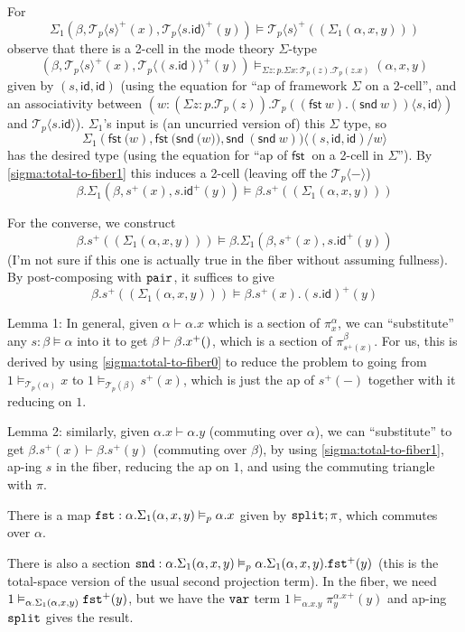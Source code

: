 \documentclass[10pt]{article}
\theoremstyle{definition}
\newcommand\dsd[1]{\ensuremath{\mathsf{#1}}}
\newcommand{\app}[2]{\ensuremath{#1 \: #2}}
\newcommand{\fst}[1]{\app{\dsd{fst}}{#1}}
\newcommand{\snd}[1]{\app{\dsd{snd}}{#1}}
\newcommand{\id}{\mathsf{id}}
\newcommand\TrPlus[2]{\ensuremath{{#1}^+(#2)}}
\newcommand\El[2]{\mathcal{T}_{#1}(#2)}
\newcommand\ApEl[2]{\mathcal{T}_{#1}\langle#2\rangle}
\newcommand\ap[2]{\ensuremath{#1 \langle #2 \rangle }}
\begin{document}
\begin{enumerate}
  For 
  \[
  \Sigma_1(\beta,\TrPlus{\ApEl{p}{s}}{x}, \TrPlus{\ApEl{p}{s.\id}}{y}) \vDash \TrPlus{\ApEl{p}{s}}{(\Sigma_1(\alpha,x,y))} 
  \]
  observe that there is a 2-cell in the mode theory $\Sigma$-type
  \[
  (\beta,\TrPlus{\ApEl{p}{s}}{x}, \TrPlus{\ApEl{p}{(s . \id)}}{y}) \vDash_{\Sigma z:p.\Sigma x:\El{p}{z}.\El{p}{z.x}} (\alpha,x,y)
  \]
  given by $(s, \id, \id)$ (using the equation for ``ap of framework
  $\Sigma$ on a 2-cell'', and an associativity between $(\ap{w:(\Sigma
    z:p.\El{p}{z}).\El{p}{(\fst w).(\snd w)}}{s , \id})$ and
  $\ApEl{p}{s.\id}$).  $\Sigma_1$'s input is (an uncurried version of)
  this $\Sigma$ type, so
  \[
  \ap{\Sigma_1 (\fst(w), \fst({\snd (w)}), \snd{(\snd w)})}{(s, \id, \id)/w}
  \]
  has the desired type (using the equation for ``ap of \fst{} on a
  2-cell in $\Sigma$'').
  By \ref{sigma:total-to-fiber1} this induces a 2-cell (leaving off the $\ApEl{p}{-}$)
  \[
  \beta.\Sigma_1(\beta,\TrPlus{s}{x}, \TrPlus{s.\id}{y}) \vDash \beta.\TrPlus{s}{(\Sigma_1(\alpha,x,y))} 
  \]

  For the converse, we construct 
  \[
  \beta.\TrPlus{s}{(\Sigma_1(\alpha,x,y))} \vDash \beta.\Sigma_1(\beta,\TrPlus{s}{x}, \TrPlus{s.\id}{y}) 
  \]
  (I'm not sure if this one is actually true in the fiber without
  assuming fullness).
  By post-composing with $\mathtt{pair}$, it suffices to give 
  \[
  \beta.\TrPlus{s}{(\Sigma_1(\alpha,x,y))} \vDash \beta.\TrPlus{s}{x}.\TrPlus{(s.\id)}{y}
  \]

  Lemma 1: In general, given $\alpha \vdash \alpha.x$ which is a section
  of $\pi^\alpha_x$, we can ``substitute'' any $s : \beta \vDash \alpha$
  into it to get $\beta \vdash \beta.\TrPlus{x}$, which is a section of
  $\pi^\beta_{\TrPlus{s}{x}}$.  For us, this is derived by using
  \ref{sigma:total-to-fiber0} to reduce the problem to going from $1
  \vDash_{\El{p}{\alpha}} x$ to $1 \vDash_{\El{p}{\beta}}
  \TrPlus{s}{x}$, which is just the ap of ${\TrPlus{s}{-}}$ together
  with it reducing on $1$.

  Lemma 2: similarly, given $\alpha.x \vdash \alpha.y$ (commuting over
  $\alpha$), we can ``substitute'' to get $\beta.\TrPlus{s}{x} \vdash
  \beta.\TrPlus{s}{y}$ (commuting over $\beta$), by using
  \ref{sigma:total-to-fiber1}, ap-ing $s$ in the fiber, reducing the ap
  on $1$, and using the commuting triangle with $\pi$.

  There is a map $\mathtt{fst} : \alpha.\Sigma_1(\alpha,x,y) \vDash_p
  \alpha.x$ given by $\mathtt{split};\pi$, which commutes over $\alpha$.

  There is also a section $\mtt{snd} : \alpha.\Sigma_1(\alpha,x,y)
  \vDash_p \alpha.\Sigma_1(\alpha,x,y).\TrPlus{\mtt{fst}}{y}$ (this is
  the total-space version of the usual second projection term).  In the
  fiber, we need $1 \vDash_{\alpha.\Sigma_1(\alpha,x,y)}
  \TrPlus{\mtt{fst}}{y}$, but we have the $\mathtt{var}$ term $1
  \vDash_{\alpha.x.y} \TrPlus{\pi^{\alpha.x}_y}{y}$ and ap-ing
  $\mathtt{split}$ gives the result.
  

\end{enumerate}
\end{document}
